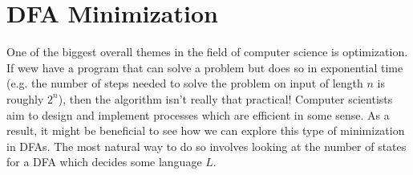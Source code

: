 \documentclass[11pt]{article}
\begin{document}
\section{DFA Minimization}

\par One of the biggest overall themes in the field of computer science is optimization.  If wew have a program that can solve a problem but does so in exponential time (e.g. the number of steps needed to solve the problem on input of length $n$ is roughly $2^n$), then the algorithm isn't really that practical!  Computer scientists aim to design and implement processes which are efficient in some sense.  As a result, it might be beneficial to see how we can explore this type of minimization in DFAs.  The most natural way to do so involves looking at the number of states for a DFA which decides some language $L$. 
\end{document}
